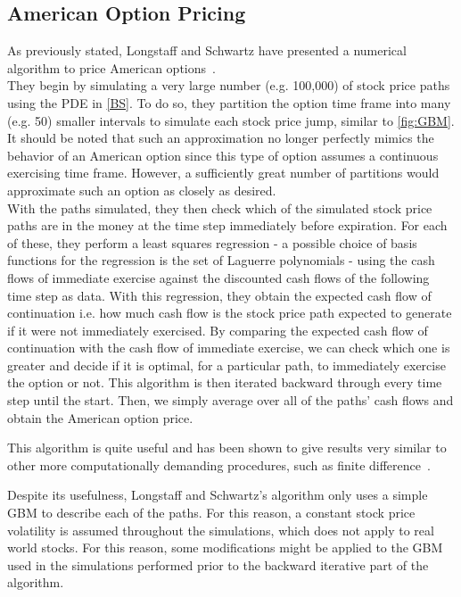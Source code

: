 \documentclass[a4paper,twocolumn,aps,prd,longbibliography,superscriptaddress]{revtex4-1}
\begin{document}
\subsection{American Option Pricing}
As previously stated, Longstaff and Schwartz have presented a numerical algorithm to price American options~\cite{Longstaff}.\\
They begin by simulating a very large number (e.g. 100,000) of stock price paths using the PDE in \ref{BS}. To do so, they partition the option time frame into many (e.g. 50) smaller intervals to simulate each stock price jump, similar to \autoref{fig:GBM}. It should be noted that such an approximation no longer perfectly mimics the behavior of an American option since this type of option assumes a continuous exercising time frame. However, a sufficiently great number of partitions would approximate such an option as closely as desired.\\
With the paths simulated, they then check which of the simulated stock price paths are in the money at the time step immediately before expiration. For each of these, they perform a least squares regression - a possible choice of basis functions for the regression is the set of Laguerre polynomials - using the cash flows of immediate exercise against the discounted cash flows of the following time step as data.
With this regression, they obtain the expected cash flow of continuation i.e. how much cash flow is the stock price path expected to generate if it were not immediately exercised.
By comparing the expected cash flow of continuation with the cash flow of immediate exercise, we can check which one is greater and decide if it is optimal, for a particular path, to immediately exercise the option or not.
This algorithm is then iterated backward through every time step until the start.
Then, we simply average over all of the paths' cash flows and obtain the American option price.

This algorithm is quite useful and has been shown to give results very similar to other more computationally demanding procedures, such as finite difference~\citep{Longstaff}.

Despite its usefulness, Longstaff and Schwartz's algorithm only uses a simple GBM to describe each of the paths. For this reason, a constant stock price volatility is assumed throughout the simulations, which does not apply to real world stocks.
For this reason, some modifications might be applied to the GBM used in the simulations performed prior to the backward iterative part of the algorithm.
\end{document}
